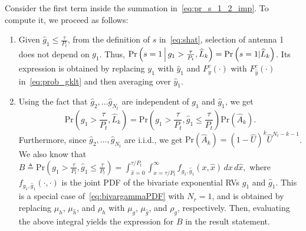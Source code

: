 \documentclass[12pt,draftcls,peerreview,onecolumn]{IEEEtran}
\newcommand{\brac}[1]{\left({#1}\right)}
\newcommand{\define}{\triangleq}
\newcommand{\prob}[1]{\text{Pr}\brac{#1}}
\newcommand{\given}{\arrowvert}
\newcommand{\Given}{\Big\arrowvert}
\newcommand{\setA}{A}
\newcommand{\setAkhat}{\widehat{\setA}_k}
\newcommand{\setL}{L}
\newcommand{\setLkhat}{\widehat{\setL}_k}
\newcommand{\mug}{{\mu_{g}}}
\newcommand{\muh}{{\mu_{h}}}
\newcommand{\Nt}{{N_t}}
\newcommand{\Nr}{{N_r}}
\newcommand{\Pt}{{P_t}}
\newcommand{\such}{h}
\newcommand{\puch}{g}
\newcommand{\gk}[1]{{\puch_{#1}}}
\newcommand{\itau}{\tau}
\newcommand{\taubypt}{\frac{\itau}{\Pt}}
\newcommand{\gkgrtaubypt}[1]{{\gk{#1}}>\taubypt}
\newcommand{\gkhatlttaubypt}[1]{{\gkhat{#1}}\leq\taubypt}
\newcommand{\yk}[1]{y_{#1}}
\newcommand{\un}{U}
\newcommand{\unhat}{\widehat{\un}}
\newcommand{\gpilotpower}{P_g}
\newcommand{\hhat}{\hat{\such}}
\newcommand{\ghat}{\hat{\puch}}
\newcommand{\yhat}{\hat{y}}
\newcommand{\gkhat}[1]{\ghat_{#1}}
\newcommand{\ykhat}[1]{\hat{y}_{#1}}
\newcommand{\muhhat}{\mu_{\hhat}}
\newcommand{\mughat}{\mu_{\ghat}}
\newcommand{\Probglt}{B}
\newcommand{\rhog}{\rho_g}
\newcommand{\rhoh}{\rho_h}
\newcommand{\ccdfyrv}[1]{ F^{c}_{y}\left(#1 \right) }
\newcommand{\ccdfyhatrv}[1]{F^{c}_{\yhat}\left(#1 \right) }
\newcommand{\xhat}{\hat{x}}
\begin{document}
Consider the first term inside the summation in~\eqref{eq:pr_s_1_2_imp}. To compute it, we proceed as follows:
\begin{enumerate}
\item  Given $\gkhatlttaubypt{1}$, from the definition of $s$ in~\eqref{eq:shat}, selection of antenna 1 does not depend on $\gk{1}$. Thus, $\prob{s = 1 \Given \gkgrtaubypt{1},\setLkhat}=\prob{s = 1 \given \setLkhat}$. Its expression is obtained by replacing $\yk{1}$ with $\ykhat{1}$ and $\ccdfyrv{\cdot}$ with $\ccdfyhatrv{\cdot}$ in~\eqref{eq:prob_gklt} and then averaging over $\ykhat{1}$. 

\item Using the fact that $\gkhat{2},\ldots\gkhat{\Nt}$ are independent of $\gk{1}$ and $\gkhat{1}$, we get  
\begin{equation}
\prob{\gkgrtaubypt{1},\setLkhat} =\prob{\gkgrtaubypt{1},\gkhatlttaubypt{1}}\prob{\setAkhat}. 
\end{equation}
Furthermore, since $\gkhat{2},\ldots,\gkhat{\Nt}$ are i.i.d., we get $\prob{\setAkhat}=\left(1- \unhat \right)^{k} \unhat^{\Nt-k-1}$. We also know that 
$\Probglt\define\prob{\gkgrtaubypt{1},\gkhatlttaubypt{1}}=\int_{\xhat=0}^{\tau/\Pt}\int_{x=\tau/\Pt}^{\infty}f_{\gk{1},\gkhat{1}}\left(x,\xhat \right)\,dx\, d\xhat,$
where $f_{\gk{1},\gkhat{1}}\left(\cdot,\cdot \right)$ is the joint PDF of the bivariate exponential RVs $\gk{1}$ and $\gkhat{1}$.  This is a special case of~\eqref{eq:bivargammaPDF} with $\Nr=1$, and is obtained by replacing $\muh$, $\muhhat$, and $\rhoh$ with $\mug$, $\mughat$, and $\rhog$, respectively.
\label{eq:bivargPDF}
Then, evaluating the above integral yields the expression for $\Probglt$ in the result statement.


\end{enumerate}
\end{document}
